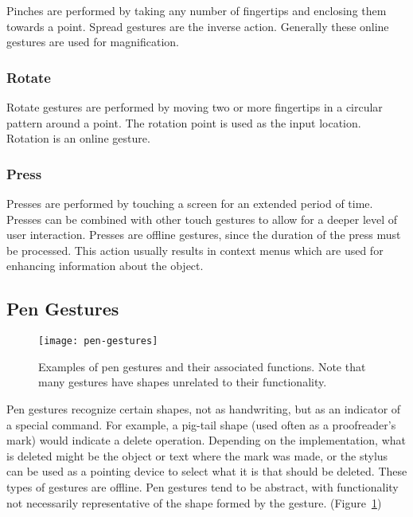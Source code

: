 Pinches are performed by taking any number of fingertips and enclosing them towards a point. Spread gestures are the inverse action. Generally these online gestures are used for magnification.

\subsubsection{Rotate}

Rotate gestures are performed by moving two or more fingertips in a circular pattern around a point. The rotation point is used as the input location.
Rotation is an online gesture.

\subsubsection{Press}

Presses are performed by touching a screen for an extended period of time. 
Presses can be combined with other touch gestures to allow for a deeper level of user interaction.
Presses are offline gestures, since the duration of the press must be processed.
This action usually results in context menus which are used for enhancing information about the object.



\subsection{Pen Gestures}

\begin{figure}
\texttt{[image: pen-gestures]}
\caption[Examples of pen gestures]{Examples of pen gestures and their associated functions. Note that many gestures have shapes unrelated to their functionality.
\cite{inkgestures}}
\label{fig:pengestures}
\end{figure}

Pen gestures recognize certain shapes, not as handwriting, but as an indicator of a special command.
For example, a pig-tail shape (used often as a proofreader's mark) would indicate a delete operation. 
Depending on the implementation, what is deleted might be the object or text where the mark was made, or the stylus can be used as a pointing device to select what it is that should be deleted.
These types of gestures are offline.
Pen gestures tend to be abstract, with functionality not necessarily representative of the shape formed by the gesture. (Figure~\ref{fig:pengestures})


